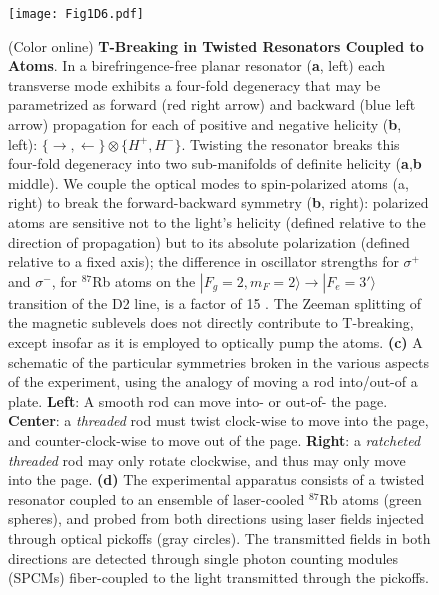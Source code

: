 \documentclass[aps,pra,twocolumn,groupedaddress,10pt,showpacs]{revtex4-1}
\begin{document}
\begin{figure}[!ht]
\texttt{[image: Fig1D6.pdf]}
\caption{(Color online) \textbf{T-Breaking in Twisted Resonators Coupled to Atoms}. In a birefringence-free planar resonator (\textbf{a}, left) each transverse mode exhibits a four-fold degeneracy that may be parametrized as forward (red right arrow) and backward (blue left arrow) propagation for each of positive and negative helicity (\textbf{b}, left): $\{\rightarrow,\leftarrow\}\otimes\{H^+,H^-\}$. Twisting the resonator breaks this four-fold degeneracy into two sub-manifolds of definite helicity (\textbf{a},\textbf{b} middle). We couple the optical modes to spin-polarized atoms (a, right) to break the forward-backward symmetry (\textbf{b}, right): polarized atoms are sensitive not to the light's helicity (defined relative to the direction of propagation) but to its absolute polarization (defined relative to a fixed axis); the difference in oscillator strengths for $\sigma^+$ and $\sigma^-$, for $^{87}$Rb atoms on the $|F_g=2,m_F=2\rangle\rightarrow |F_e=3'\rangle$ transition of the D2 line, is a factor of 15 \cite{steck2001rubidium}. The Zeeman splitting of the magnetic sublevels does not directly contribute to T-breaking, except insofar as it is employed to optically pump the atoms. \textbf{(c)} A schematic of the particular symmetries broken in the various aspects of the experiment, using the analogy of moving a rod into/out-of a plate. \textbf{Left}: A smooth rod can move into- or out-of- the page. \textbf{Center}: a {\it threaded} rod must twist clock-wise to move into the page, and counter-clock-wise to move out of the page. \textbf{Right}: a {\it ratcheted threaded} rod may only rotate clockwise, and thus may only move into the page. \textbf{(d)} The experimental apparatus consists of a twisted resonator coupled to an ensemble of laser-cooled $^{87}$Rb atoms (green spheres), and probed from both directions using laser fields injected through optical pickoffs (gray circles). The transmitted fields in both directions are detected through single photon counting modules (SPCMs) fiber-coupled to the light transmitted through the pickoffs.
}
\label{fig:setup}
\end{figure}
\end{document}

